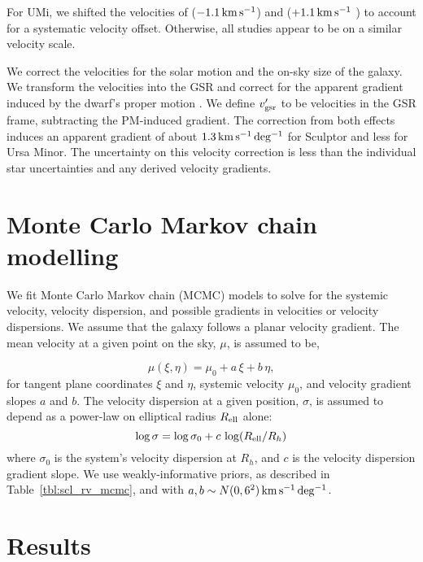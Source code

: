 For UMi, we shifted the velocities of \citet{spencer+2018}
(\(-1.1\,{\rm km\,s^{-1}}\)) and \citet{pace+2020} (\(+1.1\,{\rm km\,s^{-1}}\) ) to account for
a systematic velocity offset. Otherwise, all studies appear to be on a
similar velocity scale.

We correct the velocities for the solar motion and the on-sky size of
the galaxy. We transform the velocities into the GSR and correct for the
apparent gradient induced by the dwarf's proper motion
\citep[see,][]{WMO2008, strigari2010}. We define \(v_{\rm gsr}'\) to be
velocities in the GSR frame, subtracting the PM-induced gradient. The
correction from both effects induces an apparent gradient of about
\(1.3\,{\rm km\,s^{-1}\,deg^{-1}}\) for Sculptor and less for Ursa Minor. The uncertainty
on this velocity correction is less than the individual star
uncertainties and any derived velocity gradients.

\section{Monte Carlo Markov chain
modelling}\label{monte-carlo-markov-chain-modelling}

We fit Monte Carlo Markov chain (MCMC) models to solve for the systemic
velocity, velocity dispersion, and possible gradients in velocities or
velocity dispersions. We assume that the galaxy follows a planar
velocity gradient. The mean velocity at a given point on the sky,
\(\mu\), is assumed to be,

\begin{equation}{
\mu(\xi, \eta) = \mu_0 + a\,\xi + b\,\eta,
}\end{equation} for tangent plane coordinates \(\xi\) and \(\eta\),
systemic velocity \(\mu_0\), and velocity gradient slopes \(a\) and
\(b\). The velocity dispersion at a given position, \(\sigma\), is
assumed to depend as a power-law on elliptical radius \(R_{\rm ell}\)
alone: \begin{equation}{
\log \sigma = \log \sigma_0 + c\,\log(R_{\rm ell} / R_h)
}\end{equation} where \(\sigma_0\) is the system's velocity dispersion
at \(R_h\), and \(c\) is the velocity dispersion gradient slope. We use
weakly-informative priors, as described in Table~\ref{tbl:scl_rv_mcmc},
and with \(a, b \sim N(0, 6^2)\,{\rm km\,s^{-1}\,deg^{-1}}\).

\section{Results}\label{sec:rv_results}

